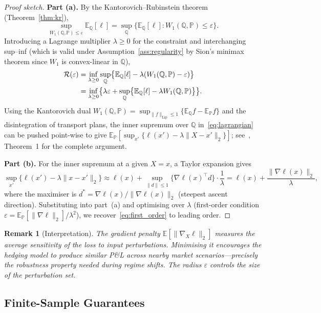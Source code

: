 \documentclass[11pt]{article}
\newtheorem{remark}[theorem]{Remark}
\newcommand{\E}{\mathbb{E}}
\newcommand{\PP}{\mathbb{P}}
\newcommand{\QQ}{\mathbb{Q}}
\begin{document}
\begin{proof}[Proof sketch]
\textbf{Part (a).}  By the Kantorovich--Rubinstein theorem (Theorem~\ref{thm:kr}),
\[
    \sup_{W_1(\QQ,\PP)\le\varepsilon}\E_\QQ[\ell] = \sup_{\QQ}\bigl\{\E_\QQ[\ell] : W_1(\QQ,\PP)\le\varepsilon\bigr\}.
\]
Introducing a Lagrange multiplier $\lambda\ge 0$ for the constraint and interchanging sup--inf (which is valid under Assumption~\ref{ass:regularity} by Sion's minimax theorem since $W_1$ is convex-linear in $\QQ$),
\begin{align}
    \mathcal{R}(\varepsilon)
    &= \inf_{\lambda\ge 0}\sup_\QQ\bigl\{\E_\QQ[\ell] - \lambda(W_1(\QQ,\PP)-\varepsilon)\bigr\} \notag\\
    &= \inf_{\lambda\ge 0}\bigl\{\lambda\varepsilon + \sup_\QQ\bigl\{\E_\QQ[\ell] - \lambda W_1(\QQ,\PP)\bigr\}\bigr\}. \label{eq:lagrangian}
\end{align}
Using the Kantorovich dual $W_1(\QQ,\PP) = \sup_{\|f\|_{\mathrm{Lip}}\le 1}\{\E_\QQ f - \E_\PP f\}$ and the disintegration of transport plans, the inner supremum over $\QQ$ in~\eqref{eq:lagrangian} can be pushed point-wise to give $\E_\PP[\sup_{x'}\{\ell(x') - \lambda\|X-x'\|_2\}]$; see~\citet{blanchet2019quantifying}, Theorem~1 for the complete argument.

\textbf{Part (b).} For the inner supremum at a given $X=x$, a Taylor expansion gives
\[
    \sup_{x'}\{\ell(x') - \lambda\|x-x'\|_2\} \approx \ell(x) + \sup_{\|d\|\le 1}\{\nabla\ell(x)^\top d\}\cdot\frac{1}{\lambda} = \ell(x) + \frac{\|\nabla\ell(x)\|_2}{\lambda},
\]
where the maximiser is $d^* = \nabla\ell(x)/\|\nabla\ell(x)\|_2$ (steepest ascent direction).
Substituting into part~(a) and optimising over $\lambda$ (first-order condition $\varepsilon = \E_\PP[\|\nabla\ell\|_2]/\lambda^2$), we recover~\eqref{eq:first_order} to leading order.
\end{proof}

\begin{remark}[Interpretation]
The gradient penalty $\E[\|\nabla_X\ell\|_2]$ measures the average \emph{sensitivity} of the loss to input perturbations.  Minimising it encourages the hedging model to produce similar P\&L across nearby market scenarios---precisely the robustness property needed during regime shifts.  The radius $\varepsilon$ controls the size of the perturbation set.
\end{remark}

\subsection{Finite-Sample Guarantees}
\end{document}
